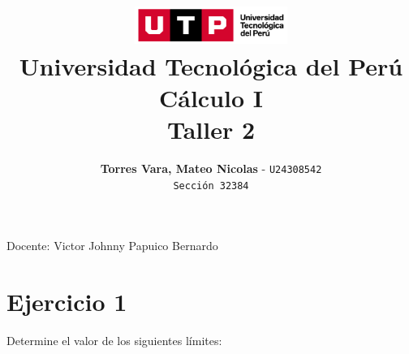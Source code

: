 \documentclass[12pt]{article}
\title{
  \vspace{2cm}
  \pagenumbering{gobble}
  \includegraphics[width=5cm]{../assets/logo-utp.png} \\
  \vspace{1cm}
  \textbf{Universidad Tecnológica del Perú} \\
  \vspace{2cm}
  \textbf{Cálculo I} \\
  \vspace{1cm}
  \large \textbf{Taller 2}
}
\author{
  \textbf{Torres Vara, Mateo Nicolas} - \texttt{U24308542} \\
  \texttt{Sección 32384}
}
\begin{document}
\maketitle
\begin{center}

  Docente: Victor Johnny Papuico Bernardo

\end{center}

%
%

\newpage
{}

\section*{Ejercicio 1}
\noindent Determine el valor de los siguientes límites:
\end{document}
